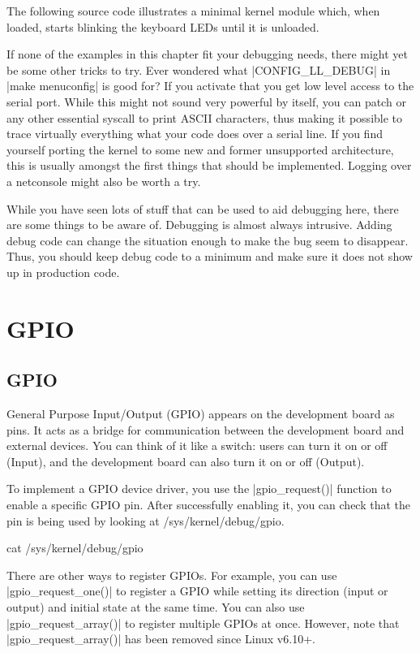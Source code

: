 \documentclass[10pt, oneside]{book}
\begin{document}
The following source code illustrates a minimal kernel module which, when loaded, starts blinking the keyboard LEDs until it is unloaded.


If none of the examples in this chapter fit your debugging needs, there might yet be some other tricks to try.
Ever wondered what \cpp|CONFIG_LL_DEBUG| in \sh|make menuconfig| is good for?
If you activate that you get low level access to the serial port.
While this might not sound very powerful by itself, you can patch  or any other essential syscall to print ASCII characters, thus making it possible to trace virtually everything what your code does over a serial line.
If you find yourself porting the kernel to some new and former unsupported architecture, this is usually amongst the first things that should be implemented.
Logging over a netconsole might also be worth a try.

While you have seen lots of stuff that can be used to aid debugging here, there are some things to be aware of. Debugging is almost always intrusive.
Adding debug code can change the situation enough to make the bug seem to disappear.
Thus, you should keep debug code to a minimum and make sure it does not show up in production code.

\section{GPIO}
\label{sec:gpio}
\subsection{GPIO}
\label{sec:gpio_introduction}
General Purpose Input/Output (GPIO) appears on the development board as pins.
It acts as a bridge for communication between the development board and external devices.
You can think of it like a switch: users can turn it on or off (Input), and the development board can also turn it on or off (Output).

To implement a GPIO device driver, you use the \cpp|gpio_request()| function to enable a specific GPIO pin.
After successfully enabling it, you can check that the pin is being used by looking at /sys/kernel/debug/gpio.

\begin{codebash}
cat /sys/kernel/debug/gpio
\end{codebash}

There are other ways to register GPIOs.
For example, you can use \cpp|gpio_request_one()| to register a GPIO while setting its direction (input or output) and initial state at the same time.
You can also use \cpp|gpio_request_array()| to register multiple GPIOs at once. However, note that \cpp|gpio_request_array()| has been removed since Linux v6.10+.
\end{document}
